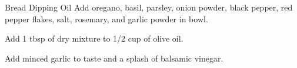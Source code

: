 \documentclass[../main.tex]{subfiles}
\begin{document}
\begin{recipe}{Bread Dipping Oil}{}{}
    Add oregano, basil, parsley, onion powder,
    black pepper, red pepper flakes, salt, rosemary,
    and garlic powder in bowl.

    Add 1 tbsp of dry mixture to 1/2 cup of olive oil.

    Add minced garlic to taste and a splash
    of balsamic vinegar.
\end{recipe}
\end{document}
